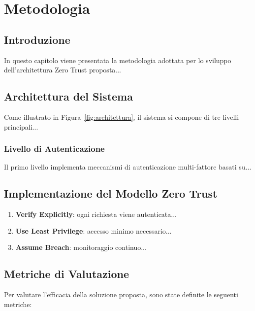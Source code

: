 \chapter{Metodologia}
\label{ch:metodologia}

\section{Introduzione}

In questo capitolo viene presentata la metodologia adottata per lo sviluppo dell'architettura Zero Trust proposta...

\section{Architettura del Sistema}


Come illustrato in Figura~\ref{fig:architettura}, il sistema si compone di tre livelli principali...

\subsection{Livello di Autenticazione}

Il primo livello implementa meccanismi di autenticazione multi-fattore basati su...


\section{Implementazione del Modello Zero Trust}

\begin{enumerate}
    \item \textbf{Verify Explicitly}: ogni richiesta viene autenticata...
    \item \textbf{Use Least Privilege}: accesso minimo necessario...
    \item \textbf{Assume Breach}: monitoraggio continuo...
\end{enumerate}

\section{Metriche di Valutazione}

Per valutare l'efficacia della soluzione proposta, sono state definite le seguenti metriche:

